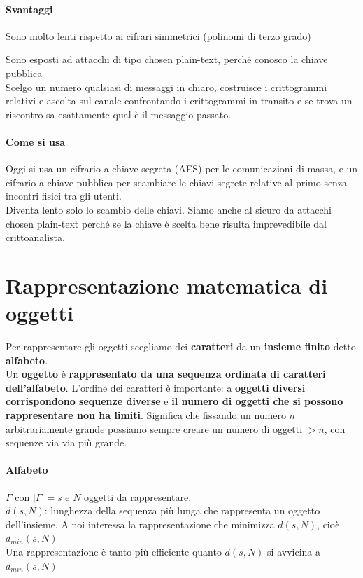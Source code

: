 \documentclass[10pt]{book}
\begin{document}
\paragraph{Svantaggi}
\begin{list}{}{}
	\item Sono molto lenti rispetto ai cifrari simmetrici (polinomi di terzo grado)
	\item Sono esposti ad attacchi di tipo chosen plain-text, perché conosco la chiave pubblica\\
	Scelgo un numero qualsiasi di messaggi in chiaro, costruisce i crittogrammi relativi e ascolta sul canale confrontando i crittogrammi in transito e se trova un riscontro sa esattamente qual è il messaggio passato.
\end{list}
\paragraph{Come si usa} Oggi si usa un cifrario a chiave segreta (AES) per le comunicazioni di massa, e un cifrario a chiave pubblica per scambiare le chiavi segrete relative al primo senza incontri fisici tra gli utenti.\\
Diventa lento solo lo scambio delle chiavi. Siamo anche al sicuro da attacchi chosen plain-text perché se la chiave è scelta bene risulta imprevedibile dal crittoanalista.
\section{Rappresentazione matematica di oggetti}
Per rappresentare gli oggetti scegliamo dei \textbf{caratteri} da un \textbf{insieme finito} detto \textbf{alfabeto}.\\
Un \textbf{oggetto} è \textbf{rappresentato da una sequenza ordinata di caratteri dell'alfabeto}. L'ordine dei caratteri è importante: a \textbf{oggetti diversi corrispondono sequenze diverse} e \textbf{il numero di oggetti che si possono rappresentare non ha limiti}. Significa che fissando un numero $n$ arbitrariamente grande possiamo sempre creare un numero di oggetti $> n$, con sequenze via via più grande.
\paragraph{Alfabeto} $\Gamma$ con $|\Gamma| = s$ e $N$ oggetti da rappresentare.\\
$d(s, N)$: lunghezza della sequenza più lunga che rappresenta un oggetto dell'insieme. A noi interessa la rappresentazione che minimizza $d(s, N)$, cioè $d_{min}(s, N)$\\
Una rappresentazione è tanto più efficiente quanto $d(s, N)$ si avvicina a $d_{min}(s, N)$
\end{document}
